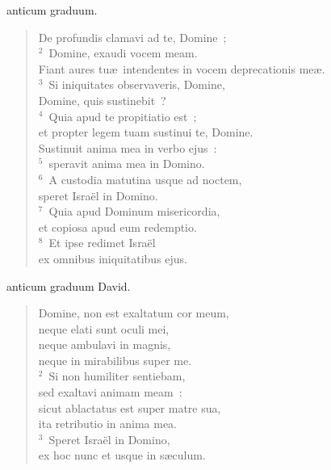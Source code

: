\bchapter[Psalm]
anticum graduum. \begin{verse}De profundis clamavi ad te, Domine~;\\
${}^{2}$~Domine, exaudi vocem meam.\\ Fiant aures tu\ae\ intendentes in vocem deprecationis me\ae .\\
${}^{3}$~Si iniquitates observaveris, Domine,\\ Domine, quis sustinebit~?\\
${}^{4}$~Quia apud te propitiatio est~;\\ et propter legem tuam sustinui te, Domine.\\ Sustinuit anima mea in verbo ejus~:\\
${}^{5}$~speravit anima mea in Domino.\\
${}^{6}$~A custodia matutina usque ad noctem,\\ speret Isra\"el in Domino.\\
${}^{7}$~Quia apud Dominum misericordia,\\ et copiosa apud eum redemptio.\\
${}^{8}$~Et ipse redimet Isra\"el\\ ex omnibus iniquitatibus ejus.\end{verse}



\bchapter[Psalm]
anticum graduum David. \begin{verse}Domine, non est exaltatum cor meum,\\ neque elati sunt oculi mei,\\ neque ambulavi in magnis,\\ neque in mirabilibus super me.\\
${}^{2}$~Si non humiliter sentiebam,\\ sed exaltavi animam meam~:\\ sicut ablactatus est super matre sua,\\ ita retributio in anima mea.\\
${}^{3}$~Speret Isra\"el in Domino,\\ ex hoc nunc et usque in s\ae culum.\end{verse}



